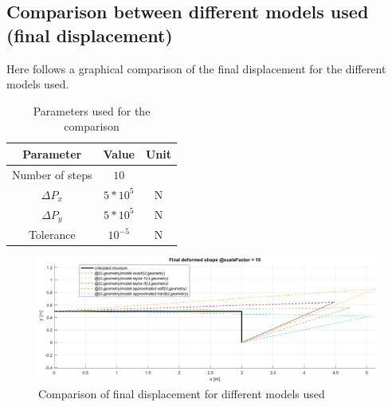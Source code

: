 \subsection{Comparison between different models used (final displacement)}

Here follows a graphical comparison of the final displacement for the different models used.

\begin{table}[H]
    \centering
    \begin{tabular}{|c|c|c|}
        \hline
        \textbf{Parameter} & \textbf{Value} & \textbf{Unit} \\ \hline
        Number of steps    & $10$           & ~             \\ \hline
        $\Delta P_x$       & $5*10^{5}$     & N             \\ \hline
        $\Delta P_y$       & $5*10^{5}$     & N             \\ \hline
        Tolerance          & $10^{-5}$      & N             \\ \hline
    \end{tabular}
    \caption{Parameters used for the comparison}
    \label{tab:parameters_for_final_displacement_comparison}
\end{table}

\begin{figure}[H]
    \centering
    \includegraphics[width=.9\textwidth]{img/final_displacement_comparison_Px5000000_Py5000000}
    \caption{Comparison of final displacement for different models used}
    \label{fig:final_displacement_comparison}
\end{figure}

